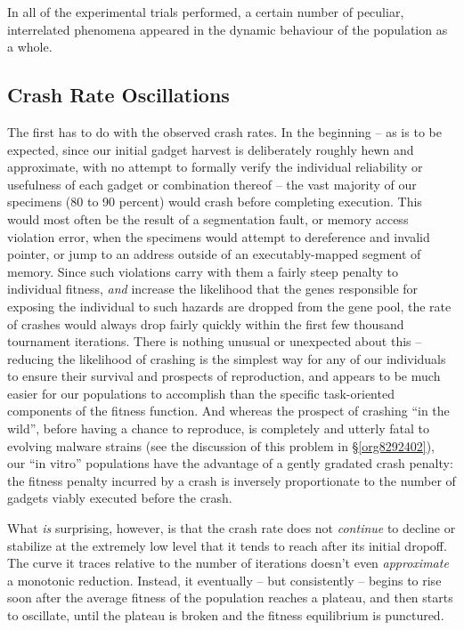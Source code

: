 \documentclass[12pt,glossary]{dalthesis}
\begin{document}
In all of the experimental trials performed, a certain number of peculiar,
interrelated phenomena appeared in the dynamic behaviour of the population
as a whole. 

\subsection{Crash Rate Oscillations}
\label{sec:org3cb64d4}
The first has to do with the observed crash rates. In the beginning -- as is to
be expected, since our initial gadget harvest is deliberately roughly hewn
and approximate, with no attempt to formally verify the individual reliability
or usefulness of each gadget or combination thereof -- the vast majority of our
specimens (80 to 90 percent) would crash before completing execution. This would
most often be the result of a segmentation fault, or memory access violation error,
when the specimens would attempt to dereference and invalid pointer, or jump to an
address outside of an executably-mapped segment of memory. Since such violations
carry with them a fairly steep penalty to individual fitness, \emph{and} increase the
likelihood that the genes responsible for exposing the individual to such hazards
are dropped from the gene pool, the rate of crashes would always drop fairly quickly
within the first few thousand tournament iterations. There is nothing unusual or
unexpected about this -- reducing the likelihood of crashing is the simplest way
for any of our individuals to ensure their survival and prospects of reproduction,
and appears to be much easier for our populations to accomplish than the specific
task-oriented components of the fitness function. And whereas the prospect of
crashing ``in the wild'', before having a chance to reproduce, is completely and
utterly fatal to evolving malware strains (see the discussion of this problem
in \S \ref{org8292402}), our ``in vitro'' populations have the advantage of a gently
gradated crash penalty: the fitness penalty incurred by a crash is inversely
proportionate to the number of gadgets viably executed before the crash.

What \emph{is} surprising, however, is that the crash rate does not \emph{continue}
to decline or stabilize at the extremely low level that it tends
to reach after its initial dropoff. The curve it traces relative to the
number of iterations doesn't even \emph{approximate} a monotonic reduction.
Instead, it eventually -- but consistently -- begins to rise soon after the
average fitness of the population reaches a plateau, and then starts to
oscillate, until the plateau is broken and the fitness equilibrium is
punctured. 
\end{document}
